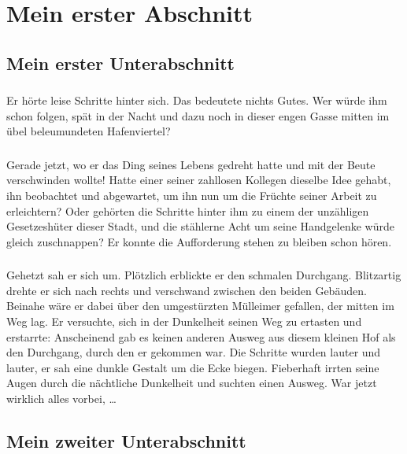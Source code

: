
\thispagestyle{empty}
\section{Mein erster Abschnitt}\label{sec:abschnitt1}
%
\subsection{Mein erster Unterabschnitt}
\subsubsection{}
Er hörte leise Schritte hinter sich. 
Das bedeutete nichts Gutes. 
Wer würde ihm schon folgen, spät in der Nacht und dazu noch in dieser engen Gasse mitten im übel beleumundeten Hafenviertel? 
\subsubsection{}
Gerade jetzt, wo er das Ding seines Lebens gedreht hatte und mit der Beute verschwinden wollte! 
Hatte einer seiner zahllosen Kollegen dieselbe Idee gehabt, ihn beobachtet und abgewartet, um ihn nun um die Früchte seiner Arbeit zu erleichtern? 
Oder gehörten die Schritte hinter ihm zu einem der unzähligen Gesetzeshüter dieser Stadt, und die stählerne Acht um seine Handgelenke würde gleich zuschnappen? 
Er konnte die Aufforderung stehen zu bleiben schon hören. 
\subsubsection{}
Gehetzt sah er sich um. Plötzlich erblickte er den schmalen Durchgang. Blitzartig drehte er sich nach rechts und verschwand zwischen den beiden Gebäuden. 
Beinahe wäre er dabei über den umgestürzten Mülleimer gefallen, der mitten im Weg lag. 
Er versuchte, sich in der Dunkelheit seinen Weg zu ertasten und erstarrte: Anscheinend gab es keinen anderen Ausweg aus diesem kleinen Hof als den Durchgang, durch den er gekommen war. 
Die Schritte wurden lauter und lauter, er sah eine dunkle Gestalt um die Ecke biegen. 
Fieberhaft irrten seine Augen durch die nächtliche Dunkelheit und suchten einen Ausweg. 
War jetzt wirklich alles vorbei, \ldots
\subsection{Mein zweiter Unterabschnitt}
